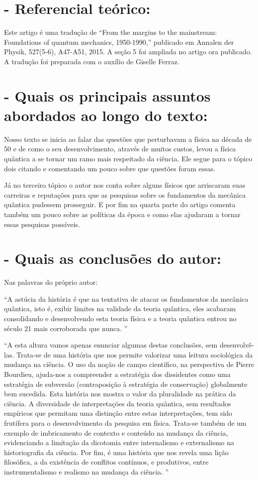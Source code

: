 \documentclass [a4paper, 12pt]{article}
\begin{document}
\section*{- Referencial teórico:}

Este artigo é uma tradução de “From the margins to the mainstream: Foundations of quantum mechanics, 1950-1990,” publicado em Annalen der Physik, 527(5-6), A47-A51, 2015. A seção 5 foi ampliada no artigo ora publicado. A tradução foi preparada com o auxílio de Giselle Ferraz.
\section*{- Quais os principais assuntos abordados ao longo do texto:}

Nosso texto se inicia ao falar das questões que perturbavam a física na década de 50 e de como o seu desenvolvimento, através de muitos custos, levou a física quântica a se tornar um ramo mais respeitado da ciência. Ele segue para o tópico dois citando e comentando um pouco sobre que questões foram essas.

Já no terceiro tópico o autor nos conta sobre alguns físicos que arriscaram suas carreiras e reputações para que as pesquisas sobre os fundamentos da mecânica quântica pudessem prosseguir. E por fim na quarta parte do artigo comenta também um pouco sobre as políticas da época e como elas ajudaram a tornar essas pesquisas possíveis.

\section*{- Quais as conclusões do autor:}

Nas palavras do próprio autor:

“A astúcia da história é que na tentativa de atacar os fundamentos da mecânica quântica, isto é, exibir limites na validade da teoria quântica, eles acabaram consolidando e desenvolvendo esta teoria física e a teoria quântica entrou no século 21 mais corroborada que nunca. ”

“A esta altura vamos apenas enunciar algumas destas conclusões, sem desenvolvê-las. Trata-se de uma história que nos permite valorizar uma leitura sociológica da mudança na ciência. O uso da noção de campo científico, na perspectiva de Pierre Bourdieu, ajuda-nos a compreender a estratégia dos dissidentes como uma estratégia de subversão (contraposição à estratégia de conservação) globalmente bem sucedida. Esta história nos mostra o valor da pluralidade na prática da ciência. A diversidade de interpretações da teoria quântica, sem resultados empíricos que permitam uma distinção entre estas interpretações, tem sido frutífera para o desenvolvimento da pesquisa em física. Trata-se também de um exemplo de imbricamento de contexto e conteúdo na mudança da ciência, evidenciando a limitação da dicotomia entre internalismo e externalismo na historiografia da ciência. Por fim, é uma história que nos revela uma lição filosófica, a da existência de conflitos contínuos, e produtivos, entre instrumentalismo e realismo na mudança da ciência. ”
\end{document}

